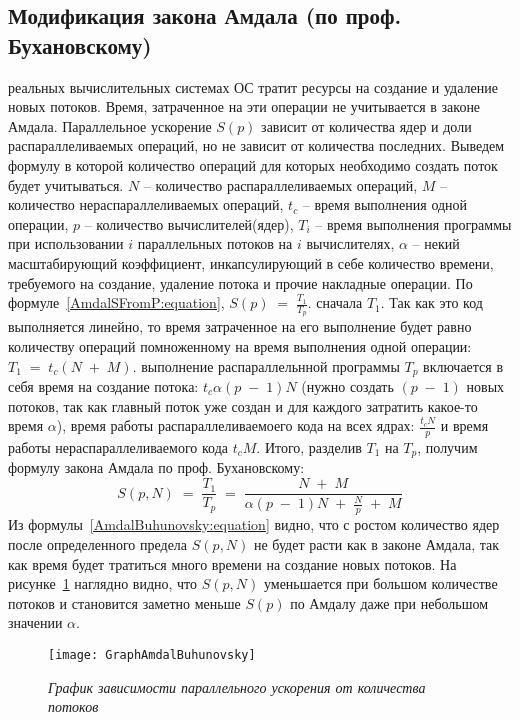 { %
	\subsection{Модификация закона Амдала (по проф. Бухановскому)}
	\Large{} реальных вычислительных системах ОС тратит ресурсы на создание и удаление новых потоков. Время, затраченное на эти операции не учитывается в законе Амдала. Параллельное ускорение $S(p)$ зависит от количества ядер и доли распараллеливаемых операций, но не зависит от количества последних. Выведем формулу в которой количество операций для которых необходимо создать поток будет учитываться.
	 $N$ – количество распараллеливаемых операций, $M$ – количество нераспараллеливаемых операций, $t_c$ – время выполнения одной операции, $p$ – количество вычислителей(ядер), $T_i$ – время выполнения программы при использовании $i$ параллельных потоков на $i$ вычислителях, $\alpha$ – некий масштабирующий коэффициент, инкапсулирующий в себе количество времени, требуемого на создание, удаление потока и прочие накладные операции. 
По формуле~\eqref{AmdalSFromP:equation}, $S(p)\;=\;\frac{T_1}{T_p}$.
	 сначала $T_1$. Так как это код выполняется линейно, то время затраченное на его выполнение будет равно количеству операций помноженному на время выполнения одной операции: $T_1\;=\;t_c(N\;+\;M)$. 
	 выполнение распараллельнной программы $T_p$ включается в себя время на создание потока: $t_c\alpha(p\;-\;1)N$ (нужно создать $(p\;-\;1)$ новых потоков, так как главный поток уже создан и для каждого затратить какое-то время $\alpha$), время работы распараллеливаемоего кода на всех ядрах: $\frac {t_cN}p$ и время работы нераспараллеливаемого кода $t_cM$. Итого, разделив $T_1$ на $T_p$, получим формулу закона Амдала по проф. Бухановскому:
	\begin{equation}
		\label{AmdalBuhunovsky:equation}
		S(p,N)\;=\;\frac{T_1}{T_p}\;=\;\frac{N\;+\;M}{\alpha(p\;-\;1)N\;+\;\frac Np\;+\;M}
	\end{equation}
	Из формулы~\eqref{AmdalBuhunovsky:equation} видно, что с ростом количество ядер после определенного предела $S(p,N)$  не будет расти как в законе Амдала, так как время будет тратиться много времени на создание новых потоков. На рисунке~\ref{GraphAmdalBuhunovsky:image} наглядно видно, что $S(p,N)$ уменьшается при большом количестве потоков и становится заметно меньше $S(p)$ по Амдалу даже при небольшом значении $\alpha$.
	\begin{figure}[H]
		\texttt{[image: GraphAmdalBuhunovsky]}
		\caption{\textit{График зависимости параллельного ускорения от количества потоков}}
		\label{GraphAmdalBuhunovsky:image}
	\end{figure}
}